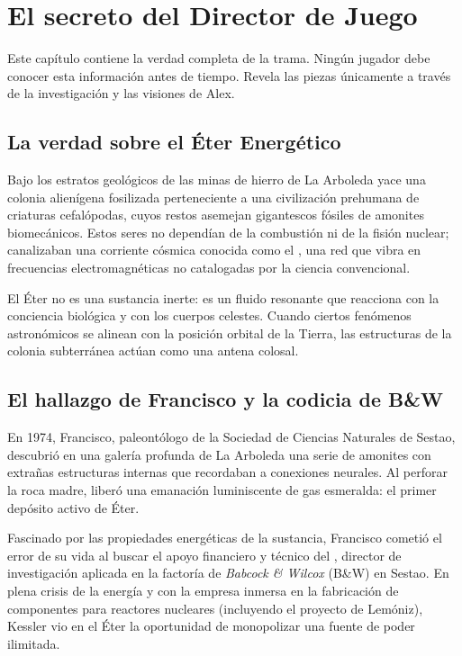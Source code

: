 \chapter{El secreto del Director de Juego}

\begin{CajaSecreto}
Este capítulo contiene la verdad completa de la trama. Ningún jugador debe conocer esta información antes de tiempo. Revela las piezas únicamente a través de la investigación y las visiones de Alex.
\end{CajaSecreto}

\section{La verdad sobre el Éter Energético}

Bajo los estratos geológicos de las minas de hierro de La Arboleda yace una colonia alienígena fosilizada perteneciente a una civilización prehumana de criaturas cefalópodas, cuyos restos asemejan gigantescos fósiles de amonites biomecánicos. Estos seres no dependían de la combustión ni de la fisión nuclear; canalizaban una corriente cósmica conocida como el , una red que vibra en frecuencias electromagnéticas no catalogadas por la ciencia convencional.

El Éter no es una sustancia inerte: es un fluido resonante que reacciona con la conciencia biológica y con los cuerpos celestes. Cuando ciertos fenómenos astronómicos se alinean con la posición orbital de la Tierra, las estructuras de la colonia subterránea actúan como una antena colosal.

\section{El hallazgo de Francisco y la codicia de B\&W}

En 1974, Francisco, paleontólogo de la Sociedad de Ciencias Naturales de Sestao, descubrió en una galería profunda de La Arboleda una serie de amonites con extrañas estructuras internas que recordaban a conexiones neurales. Al perforar la roca madre, liberó una emanación luminiscente de gas esmeralda: el primer depósito activo de Éter.

Fascinado por las propiedades energéticas de la sustancia, Francisco cometió el error de su vida al buscar el apoyo financiero y técnico del , director de investigación aplicada en la factoría de \emph{Babcock \& Wilcox} (B\&W) en Sestao. En plena crisis de la energía y con la empresa inmersa en la fabricación de componentes para reactores nucleares (incluyendo el proyecto de Lemóniz), Kessler vio en el Éter la oportunidad de monopolizar una fuente de poder ilimitada.

